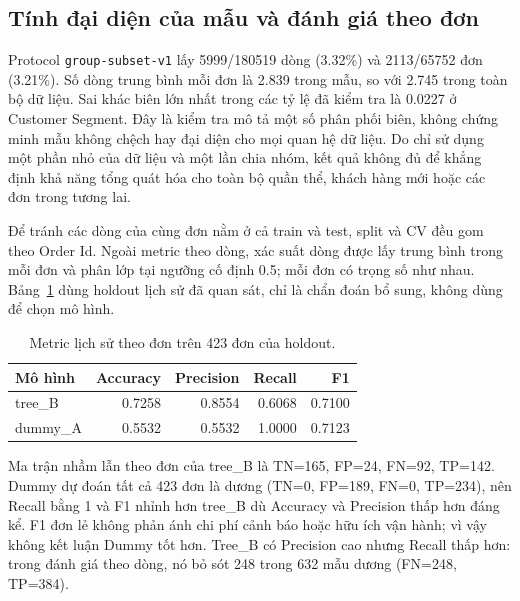 \subsection{Tính đại diện của mẫu và đánh giá theo đơn}
Protocol \texttt{group-subset-v1} lấy 5999/180519 dòng (3.32\%) và
2113/65752 đơn (3.21\%). Số dòng trung bình mỗi đơn là 2.839 trong mẫu,
so với 2.745 trong toàn bộ dữ liệu. Sai khác biên lớn nhất trong các tỷ lệ
đã kiểm tra là 0.0227 ở Customer Segment. Đây là kiểm tra mô tả một số phân
phối biên, không chứng minh mẫu không chệch hay đại diện cho mọi quan hệ dữ liệu.
Do chỉ sử dụng một phần nhỏ của dữ liệu và một lần chia nhóm, kết quả không
đủ để khẳng định khả năng tổng quát hóa cho toàn bộ quần thể, khách hàng mới
hoặc các đơn trong tương lai.

Để tránh các dòng của cùng đơn nằm ở cả train và test, split và CV đều gom
theo Order Id. Ngoài metric theo dòng, xác suất dòng được lấy trung bình trong
mỗi đơn và phân lớp tại ngưỡng cố định 0.5; mỗi đơn có trọng số như nhau.
Bảng~\ref{tab:order-metrics} dùng holdout lịch sử đã quan sát, chỉ là chẩn đoán bổ sung, không
dùng để chọn mô hình.
\begin{table}[!htbp]
\centering
\begin{tabular}{lrrrr}
\toprule
Mô hình & Accuracy & Precision & Recall & F1 \\
\midrule
tree\_B & 0.7258 & 0.8554 & 0.6068 & 0.7100 \\
dummy\_A & 0.5532 & 0.5532 & 1.0000 & 0.7123 \\
\bottomrule
\end{tabular}
\caption{Metric lịch sử theo đơn trên 423 đơn của holdout.}\label{tab:order-metrics}
\end{table}
Ma trận nhầm lẫn theo đơn của tree\_B là TN=165, FP=24, FN=92, TP=142.
Dummy dự đoán tất cả 423 đơn là dương (TN=0, FP=189, FN=0, TP=234), nên Recall bằng 1
và F1 nhỉnh hơn tree\_B dù Accuracy và Precision thấp hơn đáng kể. F1 đơn lẻ
không phản ánh chi phí cảnh báo hoặc hữu ích vận hành; vì vậy không kết luận
Dummy tốt hơn. Tree\_B có Precision cao nhưng Recall thấp hơn: trong đánh giá
theo dòng, nó bỏ sót 248 trong 632 mẫu dương (FN=248, TP=384).

